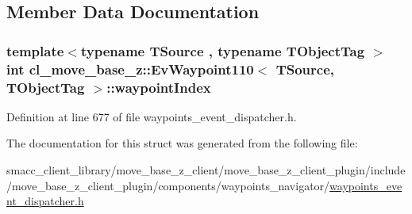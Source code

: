 \subsection{Member Data Documentation}
\subsubsection[{\texorpdfstring{waypoint\+Index}{waypointIndex}}]{\setlength{\rightskip}{0pt plus 5cm}template$<$typename T\+Source , typename T\+Object\+Tag $>$ int {\bf cl\+\_\+move\+\_\+base\+\_\+z\+::\+Ev\+Waypoint110}$<$ T\+Source, T\+Object\+Tag $>$\+::waypoint\+Index}\hypertarget{structcl__move__base__z_1_1EvWaypoint110_aac8582020381badb6b9ca7abbff16f3f}{}\label{structcl__move__base__z_1_1EvWaypoint110_aac8582020381badb6b9ca7abbff16f3f}


Definition at line 677 of file waypoints\+\_\+event\+\_\+dispatcher.\+h.



The documentation for this struct was generated from the following file\+:\begin{DoxyCompactItemize}
\item 
smacc\+\_\+client\+\_\+library/move\+\_\+base\+\_\+z\+\_\+client/move\+\_\+base\+\_\+z\+\_\+client\+\_\+plugin/include/move\+\_\+base\+\_\+z\+\_\+client\+\_\+plugin/components/waypoints\+\_\+navigator/\hyperlink{waypoints__event__dispatcher_8h}{waypoints\+\_\+event\+\_\+dispatcher.\+h}\end{DoxyCompactItemize}

